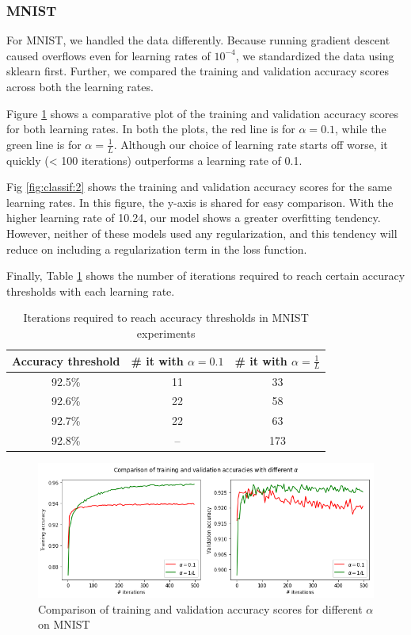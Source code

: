 \documentclass[sigconf,authordraft]{acmart}
\begin{document}
\subsubsection{MNIST}
For MNIST, we handled the data differently. Because running gradient descent caused overflows even for learning rates of $10^{-4}$, we standardized the data using sklearn\cite{scikit-learn} first. Further, we compared the training and validation accuracy scores across both the learning rates.

Figure \ref{fig:classif:1} shows a comparative plot of the training and validation accuracy scores for both learning rates. In both the plots, the red line is for $\alpha = 0.1$, while the green line is for $\alpha = \frac{1}{L}$. Although our choice of learning rate starts off worse, it quickly (< 100 iterations) outperforms a learning rate of 0.1. 

Fig \ref{fig:classif:2} shows the training and validation accuracy scores for the same learning rates. In this figure, the y-axis is shared for easy comparison. With the higher learning rate of 10.24, our model shows a greater overfitting tendency. However, neither of these models used any regularization, and this tendency will reduce on including a regularization term in the loss function.

Finally, Table \ref{tab:classif:4} shows the number of iterations required to reach certain accuracy thresholds with each learning rate.

\begin{table}
    \caption{Iterations required to reach accuracy thresholds in MNIST experiments}
    \centering
    \begin{tabular}{ccc}
        \toprule
        Accuracy threshold & \# it with $\alpha=0.1$ & \# it with $\alpha=\frac{1}{L}$ \\
        \midrule
        92.5\% & 11 & 33 \\
        92.6\% & 22 & 58 \\
        92.7\% & 22 & 63 \\
        92.8\% & -- & 173 \\
        \bottomrule
    \end{tabular}
    \label{tab:classif:4}
\end{table}

\begin{figure}
    \centering
    \includegraphics[scale=0.33]{mnist_acc.png}
    \caption{Comparison of training and validation accuracy scores for different $\alpha$ on MNIST}
    \label{fig:classif:1}
\end{figure}
\end{document}

